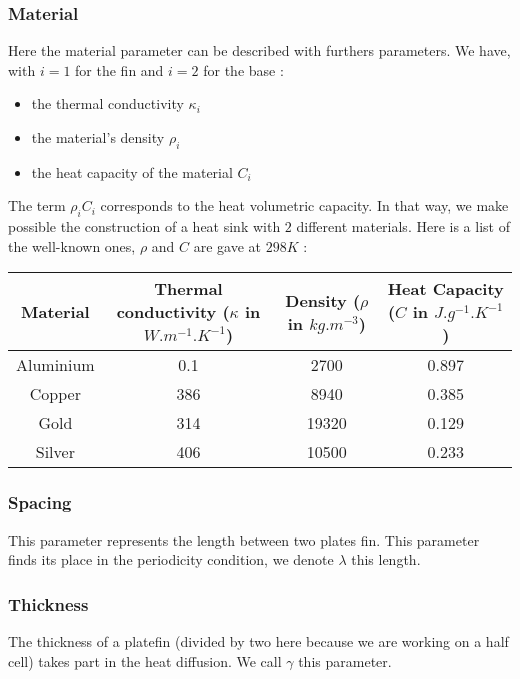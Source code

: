 \subsubsection{Material}

Here the material parameter can be described with furthers parameters. We have, with $i=1$ for the fin and $i=2$ for the base :
\begin{itemize}
\item the thermal conductivity $\kappa_i$

\item the material's density $\rho_i$

\item the heat capacity of the material $C_i$

\end{itemize}
The term $\rho_i C_i$ corresponds to the heat volumetric capacity. In that way, we make possible the construction of a heat sink with $2$ different materials. Here is a list of the well-known ones, $\rho$ and $C$ are gave at $298 K$ :

\begin{center}
\begin{tabular}{|c|c|c|c|}
  \hline
  \textbf{Material} & \textbf{Thermal conductivity} ($\kappa$ in $W.m^{-1}.K^{-1}$) & \textbf{Density }($\rho$ in $kg.m^{-3}$) & \textbf{Heat Capacity} ($C$ in $J.g^{-1}.K^{-1}$) \\
  \hline
  Aluminium & 0.1 & 2700 & 0.897 \\
  \hline
  Copper & 386 & 8940 & 0.385 \\
  \hline
  Gold & 314 & 19320 & 0.129 \\
  \hline
  Silver & 406 & 10500 & 0.233 \\
  \hline
\end{tabular}
\end{center}

\subsubsection{Spacing}
This parameter represents the length between two plates fin. This parameter finds its place in the periodicity condition, we denote $\lambda$ this length.

\subsubsection{Thickness}
The thickness of a platefin (divided by two here because we are working on a half cell) takes part in the heat diffusion. We call $\gamma$ this parameter.

